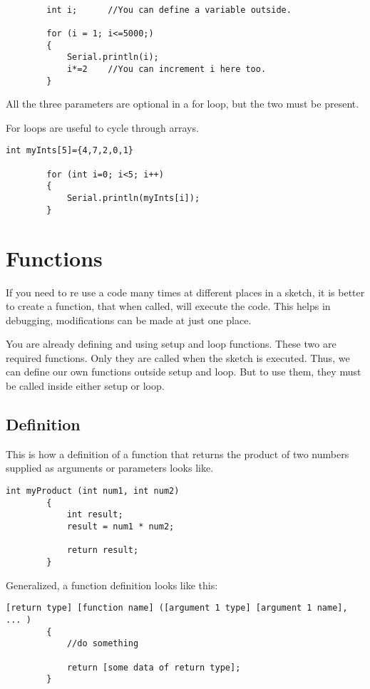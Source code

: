 \documentclass{article}
\begin{document}
		\begin{lstlisting}[gobble=8]

		int i;		//You can define a variable outside.

		for (i = 1; i<=5000;)
		{
			Serial.println(i);
			i*=2	//You can increment i here too.
		}
		\end{lstlisting}

		All the three parameters are optional in a for loop, but the two \inlncd{;} must be present.

		For loops are useful to cycle through arrays.

		\begin{lstlisting}[gobble=8]
		int myInts[5]={4,7,2,0,1}

		for (int i=0; i<5; i++)
		{
			Serial.println(myInts[i]);
		}
		\end{lstlisting}

\section{Functions}
	
	If you need to re use a code many times at different places in a sketch, it is better to create a function, that when called, will execute the code. This helps in debugging, modifications can be made at just one place.

	You are already defining and using setup and loop functions. These two are required functions. Only they are called when the sketch is executed. Thus, we can define our own functions outside setup and loop. But to use them, they must be called inside either setup or loop.

	\subsection{Definition}

		This is how a definition of a function that returns the product of two numbers supplied as arguments or parameters looks like.

		\begin{lstlisting}[gobble=8]
		int myProduct (int num1, int num2)
		{
			int result;
			result = num1 * num2;

			return result;
		}
		\end{lstlisting}

		Generalized, a function definition looks like this:

		\begin{lstlisting}[gobble=8]
		[return type] [function name] ([argument 1 type] [argument 1 name], ... )
		{
			//do something
			
			return [some data of return type];
		}
		\end{lstlisting}
\end{document}

